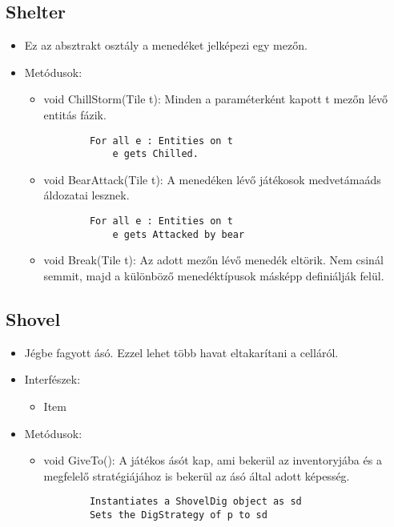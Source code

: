\subsection{Shelter}
\begin{itemize}
	\item Ez az absztrakt osztály a menedéket jelképezi egy mezőn.
	\item Metódusok:
	\begin{itemize}
		\item void ChillStorm(Tile t): Minden a paraméterként kapott t mezőn lévő entitás fázik.
		\begin{lstlisting}
		For all e : Entities on t
			e gets Chilled.
		\end{lstlisting}
		\item void BearAttack(Tile t): A menedéken lévő játékosok medvetámaáds áldozatai lesznek.
		\begin{lstlisting}
		For all e : Entities on t
			e gets Attacked by bear
		\end{lstlisting}
		\item void Break(Tile t): Az adott mezőn lévő menedék eltörik. Nem csinál semmit, majd a különböző menedéktípusok másképp definiálják felül.
	\end{itemize}
\end{itemize}

\subsection{Shovel}
\begin{itemize}
	\item Jégbe fagyott ásó. Ezzel lehet több havat eltakarítani a celláról.
	\item Interfészek:
	\begin{itemize}
		\item Item
	\end{itemize}
	\item Metódusok:
	\begin{itemize}
		\item void GiveTo(): A játékos ásót kap, ami bekerül az inventoryjába és a megfelelő stratégiájához is bekerül az ásó által adott képesség.
		\begin{lstlisting}
		Instantiates a ShovelDig object as sd
		Sets the DigStrategy of p to sd
		\end{lstlisting}
	\end{itemize}
\end{itemize}

